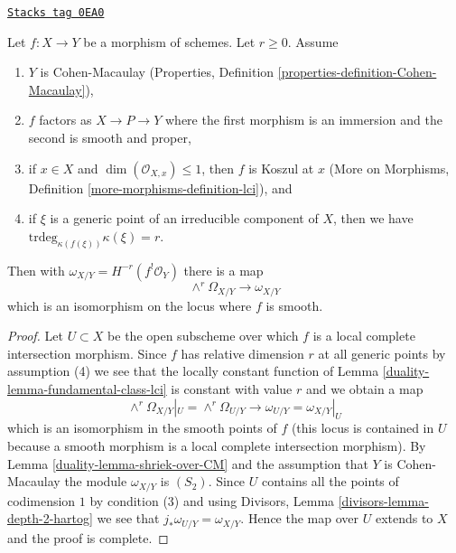 \begin{lemma}
\label{duality-lemma-fundamental-class-almost-lci}
\href{https://stacks.math.columbia.edu/tag/0EA0}{\texttt{Stacks tag 0EA0}}

Let $f : X \to Y$ be a morphism of schemes. Let $r \geq 0$. Assume
\begin{enumerate}
\item $Y$ is Cohen-Macaulay (Properties, Definition
\ref{properties-definition-Cohen-Macaulay}),
\item $f$ factors as $X \to P \to Y$ where the first morphism is
an immersion and the second is smooth and proper,
\item if $x \in X$ and $\dim(\mathcal{O}_{X, x}) \leq 1$,
then $f$ is Koszul at $x$ (More on Morphisms, Definition
\ref{more-morphisms-definition-lci}), and
\item if $\xi$ is a generic point of an irreducible component of $X$, then
we have
$\text{trdeg}_{\kappa(f(\xi))} \kappa(\xi) = r$.
\end{enumerate}
Then with $\omega_{X/Y} = H^{-r}(f^!\mathcal{O}_Y)$ there is a map
$$
\wedge^r\Omega_{X/Y} \longrightarrow \omega_{X/Y}
$$
which is an isomorphism on the locus where $f$ is smooth.
\end{lemma}

\begin{proof}

Let $U \subset X$ be the open subscheme over which $f$ is a
local complete intersection morphism. Since $f$ has relative
dimension $r$ at all generic points by assumption (4) we
see that the locally constant function of
Lemma \ref{duality-lemma-fundamental-class-lci}
is constant with value $r$ and we obtain a map
$$
\wedge^r\Omega_{X/Y}|_U = \wedge^r \Omega_{U/Y}
\longrightarrow
\omega_{U/Y} = \omega_{X/Y}|_U
$$
which is an isomorphism in the smooth points of $f$ (this locus
is contained in $U$ because a smooth morphism is a local complete
intersection morphism). By Lemma \ref{duality-lemma-shriek-over-CM}
and the assumption that $Y$ is Cohen-Macaulay
the module $\omega_{X/Y}$ is $(S_2)$.
Since $U$ contains all the points of codimension $1$ by condition (3)
and using Divisors, Lemma \ref{divisors-lemma-depth-2-hartog}
we see that $j_*\omega_{U/Y} = \omega_{X/Y}$.
Hence the map over $U$ extends to $X$ and the proof
is complete.
\end{proof}

